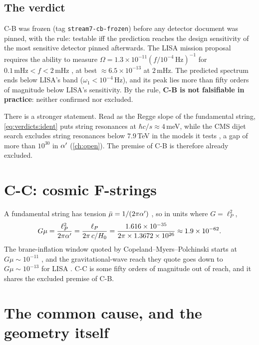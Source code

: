 \subsection{The verdict}

C-B was frozen (tag \texttt{stream7-cb-frozen}) before any detector document was pinned, with
the rule: testable iff the prediction reaches the design sensitivity of the most sensitive
detector pinned afterwards. The LISA mission proposal requires the ability to measure
$\Omega=1.3\times10^{-11}(f/10^{-4}\,\text{Hz})^{-1}$ for $0.1\,\text{mHz}<f<2\,\text{mHz}$
, at best $\approx6.5\times10^{-13}$ at $2$\,mHz. The predicted
spectrum ends below LISA's band ($\omega_1<10^{-4}$\,Hz), and its peak lies more than fifty orders
of magnitude below LISA's sensitivity. By the rule, \textbf{C-B is not falsifiable in practice}:
neither confirmed nor excluded.

There is a stronger statement. Read as the Regge slope of the fundamental string,
\eqref{eq:verdicts:ident} puts string resonances at $\hbar c/s\approx4$\,meV, while the CMS dijet
search excludes string resonances below $7.9$\,TeV in the models it tests
, a gap of more than $10^{30}$ in $\alpha'$
(\cref{ch:open}). The premise of C-B is therefore already excluded.

\section{C-C: cosmic F-strings}\label{sec:verdicts:cc}

A fundamental string has tension $\bar\mu=1/(2\pi\alpha')$ , so in units where $G=\ell_P^2$,
\[
 G\mu=\frac{\ell_P^2}{2\pi\alpha'}=\frac{\ell_P}{2\pi\,c/H_0}
 =\frac{1.616\times10^{-35}}{2\pi\times1.3672\times10^{26}}\approx1.9\times10^{-62}.
\]
The brane-inflation window quoted by Copeland--Myers--Polchinski starts at $G\mu\sim10^{-11}$
, and the gravitational-wave reach they quote goes down
to $G\mu\sim10^{-13}$ for LISA . C-C is some fifty orders of magnitude
out of reach, and it shares the excluded premise of C-B.

\section{The common cause, and the geometry itself}\label{sec:verdicts:cause}

